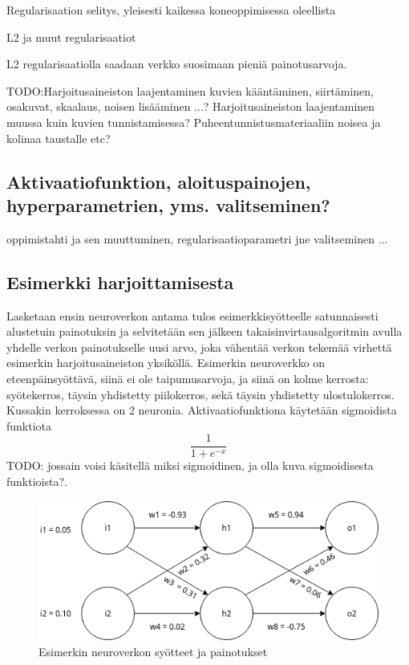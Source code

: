 \documentclass[finnish]{tktltiki2}
\theoremstyle{definition}
\theoremstyle{remark}
\begin{document}
  Regularisaation selitys, yleisesti kaikessa koneoppimisessa oleellista
  
  L2 ja muut regularisaatiot

  L2 regularisaatiolla saadaan verkko suosimaan pieniä painotusarvoja.

  TODO:Harjoitusaineiston laajentaminen kuvien kääntäminen, siirtäminen, osakuvat, skaalaus, noisen lisääminen ...?
  Harjoitusaineiston laajentaminen muussa kuin kuvien tunnistamisessa? Puheentunnistusmateriaaliin noisea ja kolinaa taustalle etc?

  \subsection{Aktivaatiofunktion, aloituspainojen, hyperparametrien, yms. valitseminen?}
  oppimistahti ja sen muuttuminen, regularisaatioparametri jne valitseminen \cite{Nielsen-neural}
  ...

  \subsection{Esimerkki harjoittamisesta}

  Lasketaan ensin neuroverkon antama tulos esimerkkisyötteelle satunnaisesti alustetuin painotuksin ja selvitetään sen jälkeen takaisinvirtausalgoritmin avulla yhdelle verkon painotukselle uusi arvo, joka vähentää verkon tekemää virhettä esimerkin harjoitusaineiston yksiköllä. Esimerkin neuroverkko on eteenpäinsyöttävä, siinä ei ole taipumusarvoja, ja siinä on kolme kerrosta: syötekerros, täysin yhdistetty piilokerros, sekä täysin yhdistetty ulostulokerros. Kussakin kerroksessa on 2 neuronia. Aktivaatiofunktiona käytetään sigmoidista funktiota $$ \frac{1}{1 + e^{-x}} $$ TODO: jossain voisi käsitellä miksi sigmoidinen, ja olla kuva sigmoidisesta funktioista?.

    \begin{figure}[h]
    \centering
    \includegraphics[scale=0.6]{draw-io-backprop-example}
    \caption{Esimerkin neuroverkon syötteet ja painotukset}
    \label{pic:backprop-example}
    \end{figure}
\end{document}
